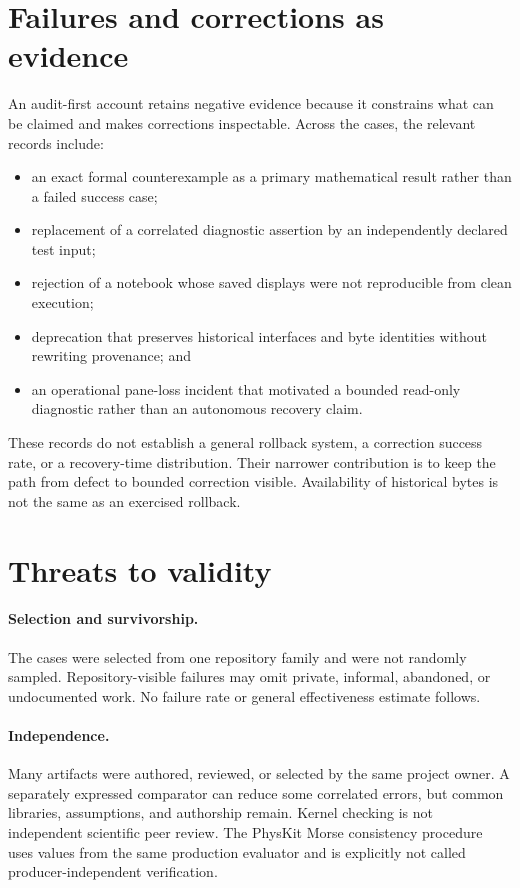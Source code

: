 \documentclass[11pt]{article}
\begin{document}
\section{Failures and corrections as evidence}
\label{sec:failures}

An audit-first account retains negative evidence because it constrains what can
be claimed and makes corrections inspectable. Across the cases, the relevant
records include:

\begin{itemize}
  \item an exact formal counterexample as a primary mathematical result rather
  than a failed success case;
  \item replacement of a correlated diagnostic assertion by an independently
  declared test input;
  \item rejection of a notebook whose saved displays were not reproducible from
  clean execution;
  \item deprecation that preserves historical interfaces and byte identities
  without rewriting provenance; and
  \item an operational pane-loss incident that motivated a bounded read-only
  diagnostic rather than an autonomous recovery claim.
\end{itemize}

These records do not establish a general rollback system, a correction success
rate, or a recovery-time distribution. Their narrower contribution is to keep
the path from defect to bounded correction visible. Availability of historical
bytes is not the same as an exercised rollback.

\section{Threats to validity}
\label{sec:threats}

\paragraph{Selection and survivorship.}
The cases were selected from one repository family and were not randomly
sampled. Repository-visible failures may omit private, informal, abandoned, or
undocumented work. No failure rate or general effectiveness estimate follows.

\paragraph{Independence.}
Many artifacts were authored, reviewed, or selected by the same project owner.
A separately expressed comparator can reduce some correlated errors, but common
libraries, assumptions, and authorship remain. Kernel checking is not
independent scientific peer review. The PhysKit Morse consistency procedure
uses values from the same production evaluator and is explicitly not called
producer-independent verification.
\end{document}
